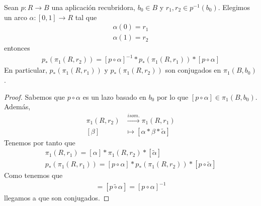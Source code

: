 \begin{coro}
    Sean $p:R \to B$ una aplicación recubridora, $b_0\in B$ y $r_1,r_2\in p^{-1}(b_0)$. Elegimos un arco $\alpha:[0,1]\to R$ tal que
    \begin{gather*}
        \alpha(0)=r_1\\
        \alpha(1)=r_2
    \end{gather*}
    entonces 
    \begin{gather*}
        p_*(\pi_1(R,r_2)) = [p\circ\alpha]^{-1} \ast p_*(\pi_1(R,r_1)) \ast [p\circ\alpha]
    \end{gather*}
    En particular, $p_*(\pi_1(R,r_1))$ y $p_*(\pi_1(R,r_2))$ son conjugados en $\pi_1(B,b_0)$.

    \begin{proof}
        Sabemos que $p\circ \alpha$ es un lazo basado en $b_0$ por lo que $[p\circ \alpha]\in \pi_1(B,b_0)$. Además,
        \begin{align*}
            \pi_1(R,r_2) &\overset{isom.}{\longrightarrow} \pi_1(R,r_1)\\
            [\beta] &\longmapsto [\alpha \ast \beta \ast \tilde{\alpha}]
        \end{align*}
        Tenemos por tanto que 
        \begin{gather*}
            \pi_1(R,r_1) = [\alpha] \ast \pi_1(R,r_2) \ast [\tilde{\alpha}]\\
            p_*(\pi_1(R,r_1)) = [p\circ \alpha] \ast p_*(\pi_1(R,r_2)) \ast [p\circ \tilde{\alpha}]
        \end{gather*}
        Como tenemos que 
        \begin{gather*}
            [p\circ \tilde{\alpha}] = [\tilde{p\circ \alpha}] = [p\circ \alpha]^{-1}
        \end{gather*}
        llegamos a que son conjugados.
    \end{proof}
\end{coro}

